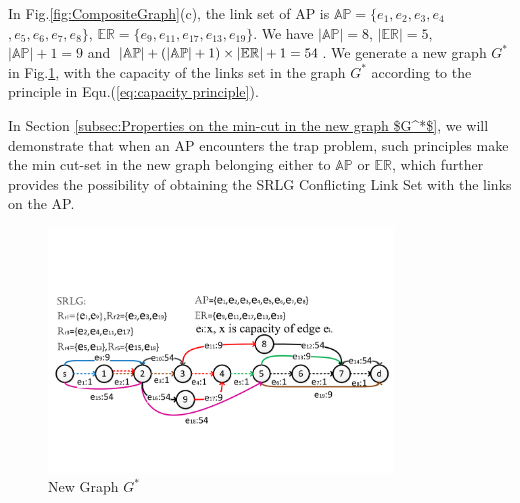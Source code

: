 In Fig.\ref{fig:CompositeGraph}(c), the link set of  AP is $\mathbb{AP}=\{e_1,e_2,e_3,e_4$
$,e_5,e_6,e_7,e_8\}$, $\mathbb{\mathbb{ER}}=\{e_9,e_{11},e_{17},e_{13},e_{19}\}$. We have $|\mathbb{AP}|=8$, $|\mathbb{\mathbb{ER}}|=5$, $|\mathbb{AP}|+1=9$ and ${\left| {{\rm{\mathbb{AP}}}} \right| + \left( {\left| {{\rm{\mathbb{AP}}}} \right| + 1} \right)\times \left| {{\rm{\mathbb{E}}}{{\rm{\mathbb{R}}}}} \right| + 1}=54$. We generate a new graph $G^*$ in Fig.\ref{fig:FlowStarGraph}, with the capacity of the links set in the graph $G^*$   according to the principle in Equ.(\ref{eq:capacity principle}).

In Section \ref{subsec:Properties on the min-cut in the new graph $G^*$}, we will demonstrate that when an AP encounters the trap problem, such principles make the min cut-set in the new graph  belonging either to $\mathbb{AP}$ or $\mathbb{\mathbb{ER}}$, which further provides the possibility of obtaining the SRLG Conflicting Link Set with the links on the AP.


\begin{figure}[tp]
  \centering
  \includegraphics[width=3.6in]{franz/FlowStarGraph}
  \caption{New Graph $G^*$}\label{fig:FlowStarGraph}
\end{figure}
